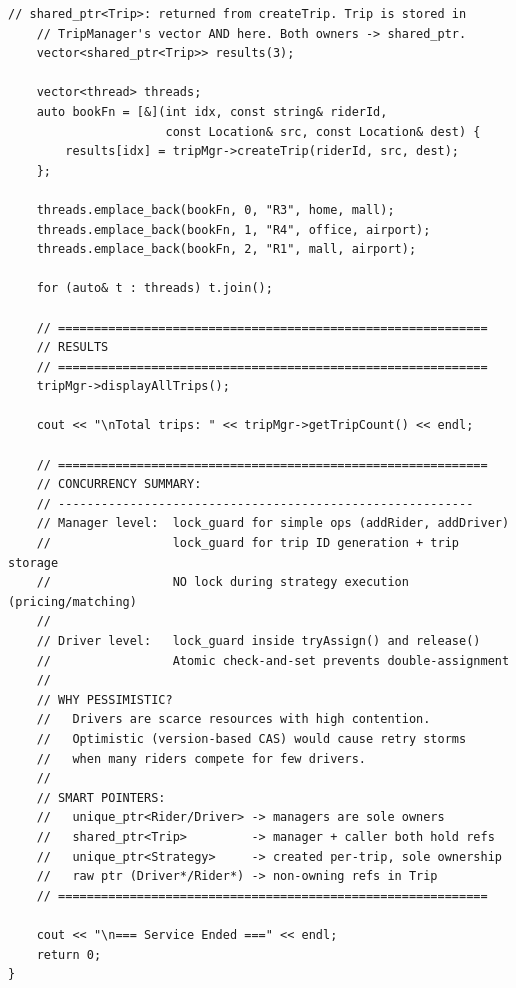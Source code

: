 \documentclass[11pt,a4paper]{article}
\begin{document}
\begin{lstlisting}[title={\texttt{main.cpp}}]
    // shared_ptr<Trip>: returned from createTrip. Trip is stored in
    // TripManager's vector AND here. Both owners -> shared_ptr.
    vector<shared_ptr<Trip>> results(3);

    vector<thread> threads;
    auto bookFn = [&](int idx, const string& riderId,
                      const Location& src, const Location& dest) {
        results[idx] = tripMgr->createTrip(riderId, src, dest);
    };

    threads.emplace_back(bookFn, 0, "R3", home, mall);
    threads.emplace_back(bookFn, 1, "R4", office, airport);
    threads.emplace_back(bookFn, 2, "R1", mall, airport);

    for (auto& t : threads) t.join();

    // ============================================================
    // RESULTS
    // ============================================================
    tripMgr->displayAllTrips();

    cout << "\nTotal trips: " << tripMgr->getTripCount() << endl;

    // ============================================================
    // CONCURRENCY SUMMARY:
    // ----------------------------------------------------------
    // Manager level:  lock_guard for simple ops (addRider, addDriver)
    //                 lock_guard for trip ID generation + trip storage
    //                 NO lock during strategy execution (pricing/matching)
    //
    // Driver level:   lock_guard inside tryAssign() and release()
    //                 Atomic check-and-set prevents double-assignment
    //
    // WHY PESSIMISTIC?
    //   Drivers are scarce resources with high contention.
    //   Optimistic (version-based CAS) would cause retry storms
    //   when many riders compete for few drivers.
    //
    // SMART POINTERS:
    //   unique_ptr<Rider/Driver> -> managers are sole owners
    //   shared_ptr<Trip>         -> manager + caller both hold refs
    //   unique_ptr<Strategy>     -> created per-trip, sole ownership
    //   raw ptr (Driver*/Rider*) -> non-owning refs in Trip
    // ============================================================

    cout << "\n=== Service Ended ===" << endl;
    return 0;
}
\end{lstlisting}
\end{document}
